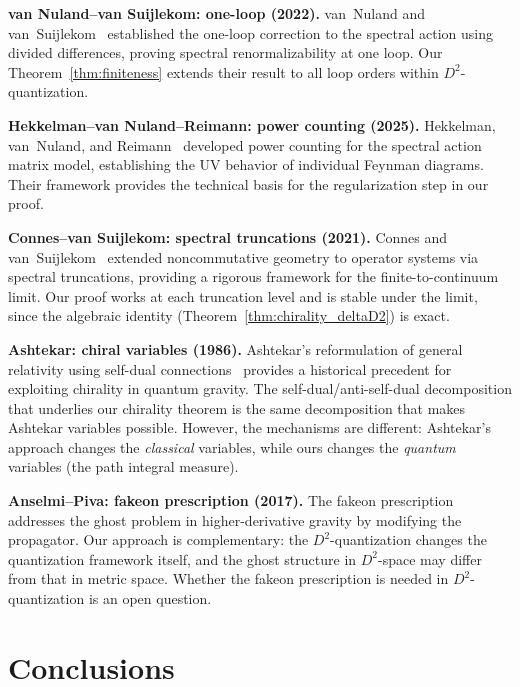 \documentclass[12pt,a4paper]{article}
\theoremstyle{definition}
\theoremstyle{remark}
\begin{document}
\smallskip\noindent
\textbf{van Nuland--van Suijlekom: one-loop (2022).}
van~Nuland and van~Suijlekom~\cite{vanNuland:2021oneloop} established the
one-loop correction to the spectral action using divided differences, proving
spectral renormalizability at one loop.  Our Theorem~\ref{thm:finiteness}
extends their result to all loop orders within $D^2$-quantization.

\smallskip\noindent
\textbf{Hekkelman--van Nuland--Reimann: power counting (2025).}
Hekkelman, van~Nuland, and Reimann~\cite{Hekkelman:2025power} developed power
counting for the spectral action matrix model, establishing the UV behavior of
individual Feynman diagrams.  Their framework provides the technical basis for
the regularization step in our proof.

\smallskip\noindent
\textbf{Connes--van Suijlekom: spectral truncations (2021).}
Connes and van~Suijlekom~\cite{Connes:2020trunc} extended noncommutative
geometry to operator systems via spectral truncations, providing a rigorous
framework for the finite-to-continuum limit.  Our proof works at each
truncation level and is stable under the limit, since the algebraic identity
(Theorem~\ref{thm:chirality_deltaD2}) is exact.

\smallskip\noindent
\textbf{Ashtekar: chiral variables (1986).}
Ashtekar's reformulation of general relativity using self-dual
connections~\cite{Ashtekar:1986yd} provides a historical precedent for
exploiting chirality in quantum gravity.  The self-dual/anti-self-dual
decomposition that underlies our chirality theorem is the same decomposition
that makes Ashtekar variables possible.  However, the mechanisms are different:
Ashtekar's approach changes the \emph{classical} variables, while ours changes
the \emph{quantum} variables (the path integral measure).

\smallskip\noindent
\textbf{Anselmi--Piva: fakeon prescription (2017).}
The fakeon prescription~\cite{Anselmi:2017ygm} addresses the ghost problem in
higher-derivative gravity by modifying the propagator.  Our approach is
complementary: the $D^2$-quantization changes the quantization framework
itself, and the ghost structure in $D^2$-space may differ from that in metric
space.  Whether the fakeon prescription is needed in $D^2$-quantization is an
open question.

\section{Conclusions}
\label{sec:conclusions}
\end{document}
